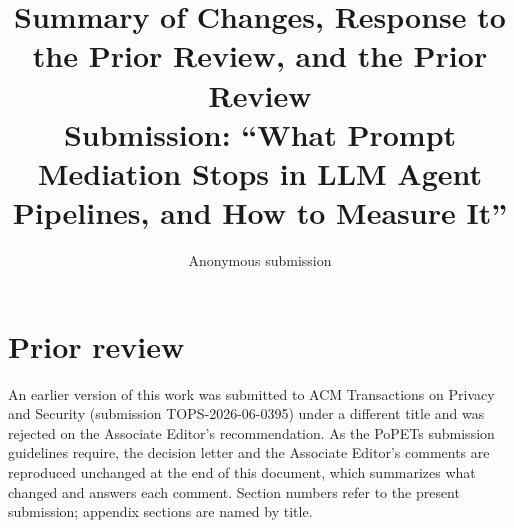 \documentclass[10pt]{article}
\title{Summary of Changes, Response to the Prior Review, and the Prior Review\\[0.3em]
\large Submission: ``What Prompt Mediation Stops in LLM Agent Pipelines, and How to Measure It''}
\author{Anonymous submission}
\date{}
\begin{document}
\maketitle

\section*{Prior review}
An earlier version of this work was submitted to ACM Transactions on Privacy and Security (submission
TOPS-2026-06-0395) under a different title and was rejected on the Associate Editor's recommendation. As the
PoPETs submission guidelines require, the decision letter and the Associate Editor's comments are reproduced
unchanged at the end of this document, which summarizes what changed and answers each comment. Section numbers refer to the
present submission; appendix sections are named by title.
\end{document}
